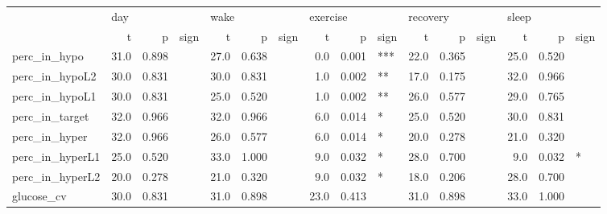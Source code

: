\begin{tabular}{lrrlrrlrrlrrlrrl}
\toprule
{} & \multicolumn{3}{l}{day} & \multicolumn{3}{l}{wake} & \multicolumn{3}{l}{exercise} & \multicolumn{3}{l}{recovery} & \multicolumn{3}{l}{sleep} \\
{} &     t &      p & sign &     t &      p & sign &        t &      p & sign &        t &      p & sign &     t &      p & sign \\
\midrule
perc_in_hypo    &  31.0 &  0.898 &      &  27.0 &  0.638 &      &      0.0 &  0.001 &  *** &     22.0 &  0.365 &      &  25.0 &  0.520 &      \\
perc_in_hypoL2  &  30.0 &  0.831 &      &  30.0 &  0.831 &      &      1.0 &  0.002 &   ** &     17.0 &  0.175 &      &  32.0 &  0.966 &      \\
perc_in_hypoL1  &  30.0 &  0.831 &      &  25.0 &  0.520 &      &      1.0 &  0.002 &   ** &     26.0 &  0.577 &      &  29.0 &  0.765 &      \\
perc_in_target  &  32.0 &  0.966 &      &  32.0 &  0.966 &      &      6.0 &  0.014 &    * &     25.0 &  0.520 &      &  30.0 &  0.831 &      \\
perc_in_hyper   &  32.0 &  0.966 &      &  26.0 &  0.577 &      &      6.0 &  0.014 &    * &     20.0 &  0.278 &      &  21.0 &  0.320 &      \\
perc_in_hyperL1 &  25.0 &  0.520 &      &  33.0 &  1.000 &      &      9.0 &  0.032 &    * &     28.0 &  0.700 &      &   9.0 &  0.032 &    * \\
perc_in_hyperL2 &  20.0 &  0.278 &      &  21.0 &  0.320 &      &      9.0 &  0.032 &    * &     18.0 &  0.206 &      &  28.0 &  0.700 &      \\
glucose_cv      &  30.0 &  0.831 &      &  31.0 &  0.898 &      &     23.0 &  0.413 &      &     31.0 &  0.898 &      &  33.0 &  1.000 &      \\
\bottomrule
\end{tabular}
